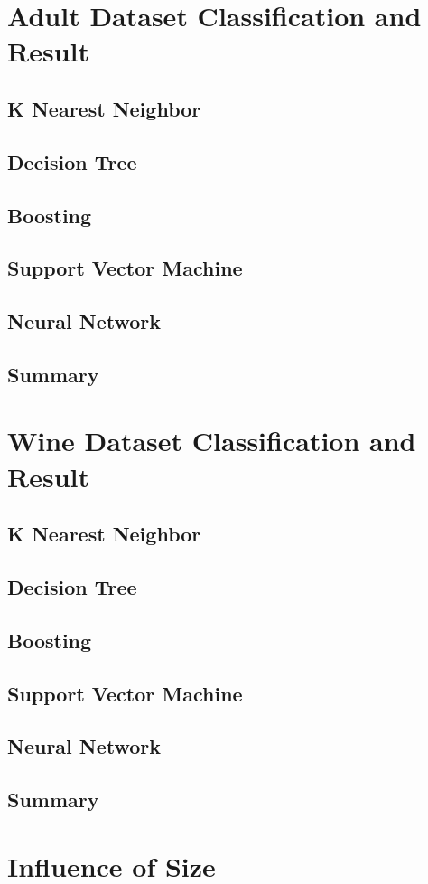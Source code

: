 \documentclass[11pt]{article}
\begin{document}
\section{Adult Dataset Classification and Result}
\subsection{K Nearest Neighbor}
\subsection{Decision Tree}
\subsection{Boosting}
\subsection{Support Vector Machine}
\subsection{Neural Network}
\subsection{Summary}

\section{Wine Dataset Classification and Result}
\subsection{K Nearest Neighbor}
\subsection{Decision Tree}
\subsection{Boosting}
\subsection{Support Vector Machine}
\subsection{Neural Network}
\subsection{Summary}


\section{Influence of Size}

\end{document}
